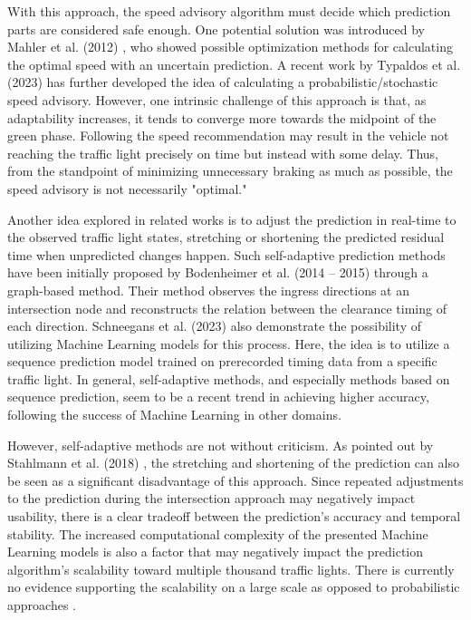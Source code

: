 With this approach, the speed advisory algorithm must decide which prediction parts are considered safe enough. One potential solution was introduced by Mahler et al. (2012) \cite{mahler_reducing_2012}, who showed possible optimization methods for calculating the optimal speed with an uncertain prediction. A recent work by Typaldos et al. (2023) \cite{typaldos_modified_2023} has further developed the idea of calculating a probabilistic/stochastic speed advisory. However, one intrinsic challenge of this approach is that, as adaptability increases, it tends to converge more towards the midpoint of the green phase. Following the speed recommendation may result in the vehicle not reaching the traffic light precisely on time but instead with some delay. Thus, from the standpoint of minimizing unnecessary braking as much as possible, the speed advisory is not necessarily "optimal."

Another idea explored in related works is to adjust the prediction in real-time to the observed traffic light states, stretching or shortening the predicted residual time when unpredicted changes happen. Such self-adaptive prediction methods have been initially proposed by Bodenheimer et al. (2014 -- 2015) \cite{bodenheimer_enabling_2014, bodenheimer_glosa_2015} through a graph-based method. Their method observes the ingress directions at an intersection node and reconstructs the relation between the clearance timing of each direction. Schneegans et al. (2023) \cite{schneegans_prediction_2023} also demonstrate the possibility of utilizing Machine Learning models for this process. Here, the idea is to utilize a sequence prediction model trained on prerecorded timing data from a specific traffic light. In general, self-adaptive methods, and especially methods based on sequence prediction, seem to be a recent trend in achieving higher accuracy, following the success of Machine Learning in other domains.

However, self-adaptive methods are not without criticism. As pointed out by Stahlmann et al. (2018) \cite{stahlmann_exploring_2018}, the stretching and shortening of the prediction can also be seen as a significant disadvantage of this approach. Since repeated adjustments to the prediction during the intersection approach may negatively impact usability, there is a clear tradeoff between the prediction's accuracy and temporal stability. The increased computational complexity of the presented Machine Learning models is also a factor that may negatively impact the prediction algorithm's scalability toward multiple thousand traffic lights. There is currently no evidence supporting the scalability on a large scale as opposed to probabilistic approaches \cite{protschky_extensive_2014, protschky_adaptive_2014}. 

